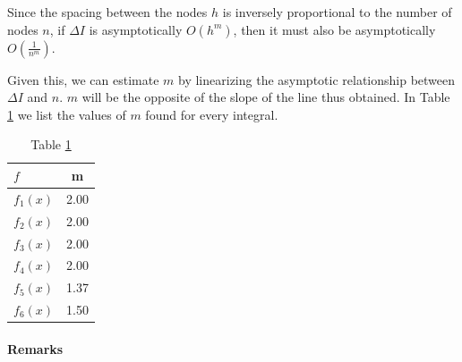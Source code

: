 \documentclass[a4paper,11]{article}
\begin{document}
Since the spacing between the nodes $h$ is inversely proportional to the 
number of nodes $n$, if $\Delta I$ is asymptotically $O(h^{m})$, then it must
also be asymptotically $O(\frac{1}{n^{m}})$.

Given this, we can estimate $m$ by linearizing the asymptotic relationship 
between $\Delta I$ and $n$. $m$ will be the opposite of the slope of 
the line thus obtained.
In Table \ref{table:trap_rule_conv_data} we list the values of $m$ found 
for every integral.

\begin{table}[ht]
	\centering
	\begin{tabular}{l|c}
		$f$ & m \\
		\hline
		$f_{1}(x)$ & 2.00\\
		$f_{2}(x)$ & 2.00\\
		$f_{3}(x)$ & 2.00\\
		$f_{4}(x)$ & 2.00\\
		$f_{5}(x)$ & 1.37\\
		$f_{6}(x)$ & 1.50\\
	\end{tabular}
	\caption{Table \ref{table:trap_rule_conv_data}}
	\label{table:trap_rule_conv_data}
\end{table}

\paragraph{Remarks}
\end{document}
